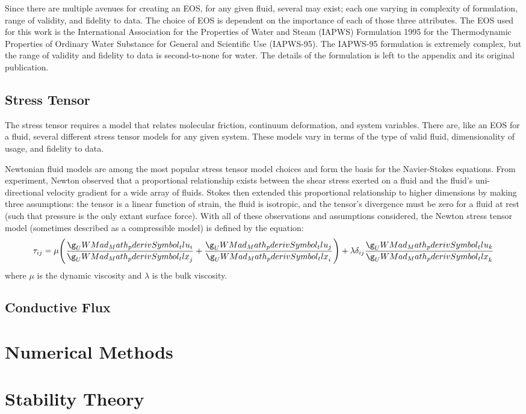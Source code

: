 \documentclass[12pt]{../UWMadThesis}
\begin{document}
Since there are multiple avenues for creating an EOS, for any given fluid, several may exist; each one varying in complexity of formulation, range of validity, and fidelity to data.
The choice of EOS is dependent on the importance of each of those three attributes.
The EOS used for this work is the International Association for the Properties of Water and Steam (IAPWS) Formulation 1995 for the Thermodynamic Properties of Ordinary Water Substance for General and Scientific Use (IAPWS-95).
The IAPWS-95 formulation is extremely complex, but the range of validity and fidelity to data is second-to-none for water.
The details of the formulation is left to the appendix and its original publication.



\subsection{Stress Tensor}
The stress tensor requires a model that relates molecular friction, continuum deformation, and system variables.
There are, like an EOS for a fluid, several different stress tensor models for any given system.
These models vary in terms of the type of valid fluid, dimensionality of usage, and fidelity to data.

Newtonian fluid models are among the most popular stress tensor model choices and form the basis for the Navier-Stokes equations.
From experiment, Newton observed that a proportional relationship exists between the shear stress exerted on a fluid and the fluid's uni-directional velocity gradient for a wide array of fluids.
Stokes then extended this proportional relationship to higher dimensions by making three assumptions: the tensor is a linear function of strain, the fluid is isotropic, and the tensor's divergence must be zero for a fluid at rest (such that pressure is the only extant surface force).
With all of these observations and assumptions considered, the Newton stress tensor model (sometimes described as a compressible model) is defined by the equation:
\begin{equation}
    \tau_{ij} = \mu \left(\pderiv{u_i}{x_j} + \pderiv{u_j}{x_i}\right) + \lambda \delta_{ij} \pderiv{u_k}{x_k}
\end{equation}
where $\mu$ is the dynamic viscosity and $\lambda$ is the bulk viscosity.




\subsection{Conductive Flux}





\section{Numerical Methods}
\section{Stability Theory}
\end{document}
